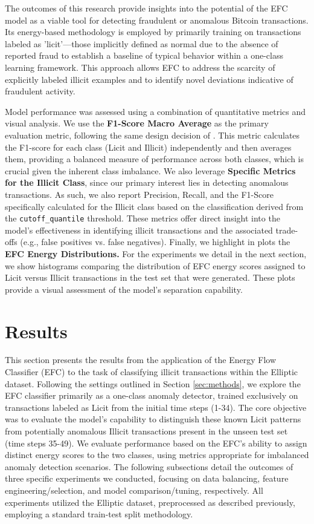 \documentclass[12pt]{article}
\begin{document}
The outcomes of this research provide insights into the potential of the EFC model as a viable tool for detecting fraudulent or
anomalous Bitcoin transactions. Its energy-based methodology is employed by primarily training on transactions labeled as
'licit'—those implicitly defined as normal due to the absence of reported fraud to establish a baseline of typical behavior
within a one-class learning framework. This approach allows EFC to address the scarcity of explicitly labeled illicit
examples and to identify novel deviations indicative of fraudulent activity.

Model performance was assessed using a combination of quantitative metrics and visual analysis. We use the \textbf{F1-Score
Macro Average} as the primary evaluation metric, following the same design decision of \cite{lorenz2021machinelearningmethodsdetect}.
This metric calculates the F1-score for each class (Licit and Illicit) independently and then averages them, providing a
balanced measure of performance across both classes, which is crucial given the inherent class imbalance. 
We also leverage \textbf{Specific Metrics for the Illicit Class}, since our primary interest lies in detecting anomalous
transactions. As such, we also report Precision, Recall, and the F1-Score specifically calculated for the Illicit class
based on the classification derived from the \texttt{cutoff\_quantile} threshold. These metrics offer direct insight into
the model's effectiveness in identifying illicit transactions and the associated trade-offs (e.g., false positives vs.
false negatives).  Finally, we highlight in plots the \textbf{EFC Energy Distributions.} For the experiments we detail in
the next section, we show histograms comparing the distribution of EFC energy scores assigned to Licit versus Illicit
transactions in the test set that were generated. These plots provide a visual assessment of the model's separation capability.

\section{Results} \label{sec:results}

This section presents the results from the application of the Energy Flow Classifier (EFC) to the task of
classifying illicit transactions within the Elliptic dataset. Following the settings outlined in Section
\ref{sec:methods}, we explore the EFC classifier primarily as a one-class anomaly detector, trained exclusively on transactions
labeled as Licit from the initial time steps (1-34). The core objective was to evaluate the model's capability to distinguish
these known Licit patterns from potentially anomalous Illicit transactions present in the unseen test set (time steps 35-49).
We evaluate performance based on the EFC's ability to assign distinct energy scores to the two classes, using
metrics appropriate for imbalanced anomaly detection scenarios. The following subsections detail the outcomes of three specific
experiments we conducted, focusing on data balancing, feature engineering/selection, and model comparison/tuning, respectively.
All experiments utilized the Elliptic dataset, preprocessed as described previously, employing a standard train-test split methodology.
\end{document}
